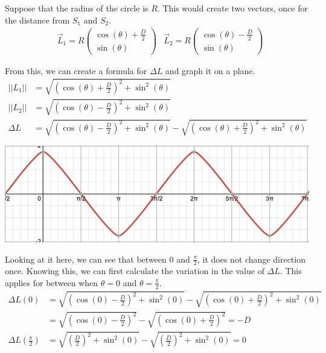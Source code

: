 \documentclass[12pt]{article}
\begin{document}
            Suppose that the radius of the circle is $R$.
            This would create two vectors, once for the distance from $S_1$ and $S_2$.
            \begin{align}
                &\vec{L}_1  =   R\begin{pmatrix}
                    \cos(\theta) + \frac{D}{2}\\
                    \sin(\theta)
                \end{pmatrix}
                &\vec{L}_2  =   R\begin{pmatrix}
                    \cos(\theta) - \frac{D}{2}\\
                    \sin(\theta)
                \end{pmatrix}
            \end{align}

            From this, we can create a formula for $\Delta L$ and graph it on a plane.
            \begin{align}
                \left| \left| L_1 \right| \right|   &=  \sqrt{\left( \cos(\theta) + \frac{D}{2} \right)^2 + \sin^2(\theta)}\\
                \left| \left| L_2 \right| \right|   &=  \sqrt{\left( \cos(\theta) - \frac{D}{2} \right)^2 + \sin^2(\theta)}\\
                \Delta L    &=  \sqrt{\left( \cos(\theta) - \frac{D}{2} \right)^2 + \sin^2(\theta)} - \sqrt{\left( \cos(\theta) + \frac{D}{2} \right)^2 + \sin^2(\theta)}
            \end{align}
            \begin{center}
                \includegraphics[width=\textwidth]{Fig-19-1.png}
            \end{center}

            Looking at it here, we can see that between 0 and $\frac{\pi}{2}$, it does not change direction once.
            Knowing this, we can first calculate the variation in the value of $\Delta L$.
            This applies for between when $\theta = 0$ and $\theta = \frac{\pi}{2}$.
            \begin{align}
                \Delta L(0) &=  \sqrt{\left( \cos(0) - \frac{D}{2} \right)^2 + \sin^2(0)} - \sqrt{\left( \cos(0) + \frac{D}{2} \right)^2 + \sin^2(0)}\\
                    &=  \sqrt{\left( \cos(0) - \frac{D}{2} \right)^2} - \sqrt{\left( \cos(0) + \frac{D}{2} \right)^2}
                    =   -D\\
                \Delta L\left( \frac{\pi}{2} \right)    &=  \sqrt{\left( \frac{D}{2} \right)^2 + \sin^2(0)} - \sqrt{\left( \frac{D}{2} \right)^2 + \sin^2(0)}
                    =   0
            \end{align}
\end{document}
